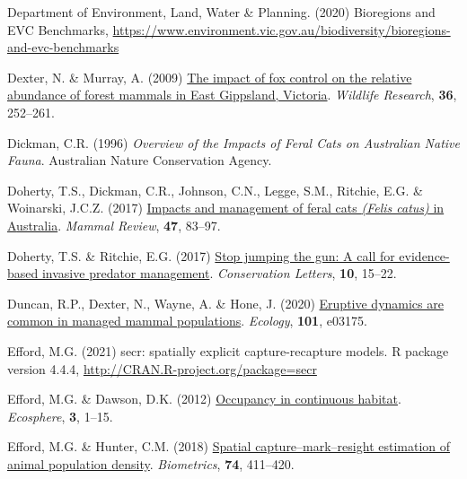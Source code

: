 \documentclass[preprint, 3p, authoryear]{elsarticle} %
\newlength{\cslhangindent}
\newlength{\cslentryspacingunit} %
\newenvironment{CSLReferences}[2] %
 {%
  \setlength{\parindent}{0pt}
  \ifodd #1
  \let\oldpar\par
  \def\par{\hangindent=\cslhangindent\oldpar}
  \fi
  \setlength{\parskip}{#2\cslentryspacingunit}
 }%
 {}
\begin{document}
\begin{CSLReferences}{1}{0}
\leavevmode{}%
Department of Environment, Land, Water \& Planning. (2020) {Bioregions and EVC Benchmarks}, \url{https://www.environment.vic.gov.au/biodiversity/bioregions-and-evc-benchmarks}

\leavevmode{}%
Dexter, N. \& Murray, A. (2009) \href{https://doi.org/10.1071/WR08135}{The impact of fox control on the relative abundance of forest mammals in {East Gippsland, Victoria}}. \emph{Wildlife Research}, \textbf{36}, 252--261.

\leavevmode{}%
Dickman, C.R. (1996) \emph{Overview of the Impacts of Feral Cats on {{A}ustralian} Native Fauna}. {A}ustralian Nature Conservation Agency.

\leavevmode{}%
Doherty, T.S., Dickman, C.R., Johnson, C.N., Legge, S.M., Ritchie, E.G. \& Woinarski, J.C.Z. (2017) \href{https://doi.org/10.1111/mam.12080}{Impacts and management of feral cats \emph{({Felis catus})} in {{A}ustralia}}. \emph{Mammal Review}, \textbf{47}, 83--97.

\leavevmode{}%
Doherty, T.S. \& Ritchie, E.G. (2017) \href{https://doi.org/10.1111/conl.12251}{Stop jumping the gun: A call for evidence-based invasive predator management}. \emph{Conservation Letters}, \textbf{10}, 15--22.

\leavevmode{}%
Duncan, R.P., Dexter, N., Wayne, A. \& Hone, J. (2020) \href{https://doi.org/10.1002/ecy.3175}{Eruptive dynamics are common in managed mammal populations}. \emph{Ecology}, \textbf{101}, e03175.

\leavevmode{}%
Efford, M.G. (2021) {secr: spatially explicit capture-recapture models. R package version 4.4.4}, \url{http://CRAN.R-project.org/package=secr}

\leavevmode{}%
Efford, M.G. \& Dawson, D.K. (2012) \href{https://doi.org/10.1890/ES11-00308.1}{Occupancy in continuous habitat}. \emph{Ecosphere}, \textbf{3}, 1--15.

\leavevmode{}%
Efford, M.G. \& Hunter, C.M. (2018) \href{https://doi.org/10.1111/biom.12766}{Spatial capture--mark--resight estimation of animal population density}. \emph{Biometrics}, \textbf{74}, 411--420.


\end{CSLReferences}
\end{document}
